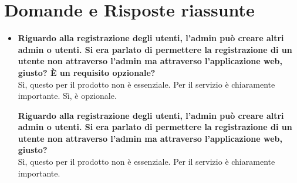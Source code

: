 \section{Domande e Risposte riassunte}
	\begin{itemize} 
		\item 
		{\bfseries Riguardo alla registrazione degli utenti, l'admin può creare altri admin o utenti. Si era parlato di permettere la registrazione di un utente non attraverso l'admin ma attraverso l'applicazione web, giusto? È un requisito opzionale?} \\
		Sì, questo per il prodotto non è essenziale. Per il servizio è chiaramente importante. Sì, è opzionale.
		
		{\bfseries Riguardo alla registrazione degli utenti, l'admin può creare altri admin o utenti. Si era parlato di permettere la registrazione di un utente non attraverso l'admin ma attraverso l'applicazione web, giusto?} \\
		Sì, questo per il prodotto non è essenziale. Per il servizio è chiaramente importante.
		
		
		
		
	\end{itemize}